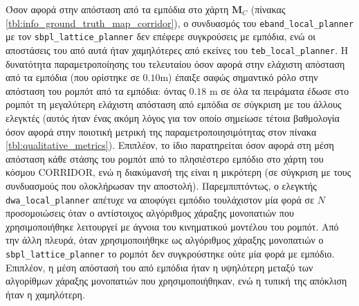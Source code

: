 Όσον αφορά στην απόσταση από τα εμπόδια στο χάρτη $\bm{M}_C$ (πίνακας
\ref{tbl:info_ground_truth_map_corridor}), ο συνδυασμός του
\texttt{eband\_local\_planner} με τον \texttt{sbpl\_lattice\_planner} δεν
επέφερε συγκρούσεις με εμπόδια, ενώ οι αποστάσεις του από αυτά ήταν χαμηλότερες
από εκείνες του \texttt{teb\_local\_planner}. Η δυνατότητα παραμετροποίησης του
τελευταίου όσον αφορά στην ελάχιστη απόσταση από τα εμπόδια (που ορίστηκε σε
$0.10$m) έπαιξε σαφώς σημαντικό ρόλο στην απόσταση του ρομπότ από τα εμπόδια:
όντας $0.18$ m σε όλα τα πειράματα έδωσε στο ρομπότ τη μεγαλύτερη ελάχιστη
απόσταση από εμπόδια σε σύγκριση με του άλλους ελεγκτές (αυτός ήταν ένας ακόμη
λόγος για τον οποίο σημείωσε τέτοια βαθμολογία όσον αφορά στην ποιοτική μετρική
της παραμετροποιησιμότητας στον πίνακα \ref{tbl:qualitative_metrics}).
Επιπλέον, το ίδιο παρατηρείται όσον αφορά στη μέση απόσταση κάθε στάσης του
ρομπότ από το πλησιέστερο εμπόδιο στο χάρτη του κόσμου CORRIDOR, ενώ η
διακύμανσή της είναι η μικρότερη (σε σύγκριση με τους συνδυασμούς που
ολοκλήρωσαν την αποστολή).  Παρεμπιπτόντως, ο ελεγκτής
\texttt{dwa\_local\_planner} απέτυχε να αποφύγει εμπόδιο τουλάχιστον μία φορά
σε $N$ προσομοιώσεις όταν ο αντίστοιχος αλγόριθμος χάραξης μονοπατιών που
χρησιμοποιήθηκε λειτουργεί με άγνοια του κινηματικού μοντέλου του ρομπότ. Από
την άλλη πλευρά, όταν χρησιμοποιήθηκε ως αλγόριθμος χάραξης μονοπατιών ο
\texttt{sbpl\_lattice\_planner} το ρομπότ δεν συγκρούστηκε ούτε μία φορά με
εμπόδιο. Επιπλέον, η μέση απόστασή του από εμπόδια ήταν η υψηλότερη μεταξύ των
αλγορίθμων χάραξης μονοπατιών που χρησιμοποιήθηκαν, ενώ η τυπική της απόκλιση
ήταν η χαμηλότερη.



